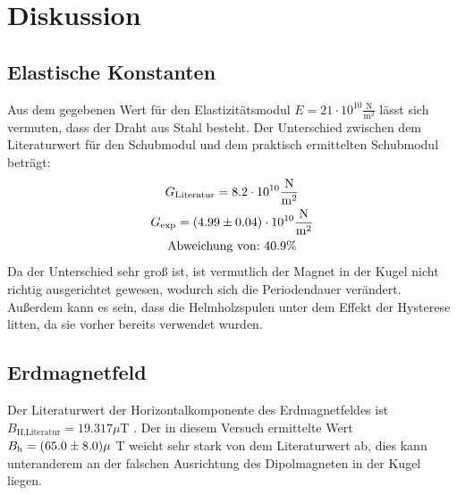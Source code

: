 \section{Diskussion}
\label{sec:Diskussion}
\subsection{Elastische Konstanten}
Aus dem gegebenen Wert für den Elastizitätsmodul $E = 21 \cdot 10^{10} \frac{\text{N}}{\text{m}^2}$ lässt sich vermuten, dass der Draht aus Stahl besteht. Der Unterschied zwischen dem Literaturwert für den Schubmodul und dem praktisch ermittelten Schubmodul beträgt:
\begin{gather*}
  G_\text{Literatur} = 8.2 \cdot 10^{10} \frac{\text{N}}{\text{m}^2} \\
  G_\text{exp} = (\num{4.99 +- 0.04}) \cdot 10^{10} \frac{\text{N}}{\text{m}^2} \\
  \text{Abweichung von:} \ 40.9 \%
\end{gather*}
Da der Unterschied sehr groß ist, ist vermutlich der Magnet in der Kugel nicht richtig ausgerichtet gewesen, wodurch sich die Periodendauer verändert. Außerdem kann es sein, dass die Helmholzspulen unter dem Effekt der Hysterese litten, da sie vorher bereits verwendet wurden.

\subsection{Erdmagnetfeld}
Der Literaturwert der Horizontalkomponente des Erdmagnetfeldes ist $B_\text{H,Literatur} = 19.317 \mu$T \cite{Literatur}. Der in diesem Versuch ermittelte Wert $B_\text{h} = (\num{65.0 +- 8.0}) \mu$ T weicht sehr stark von dem Literaturwert ab, dies kann unteranderem an der falschen Ausrichtung des Dipolmagneten in der Kugel liegen.  
